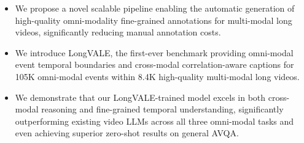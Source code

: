 \begin{itemize}
    \item We propose a novel scalable pipeline enabling the automatic generation of high-quality omni-modality fine-grained annotations for multi-modal long videos, significantly reducing manual annotation costs. 
    \item We introduce LongVALE, the first-ever benchmark providing omni-modal event temporal boundaries and cross-modal correlation-aware captions for 105K omni-modal events within 8.4K high-quality multi-modal long videos.
    \item We demonstrate that our LongVALE-trained model excels in both cross-modal reasoning and fine-grained temporal understanding, significantly outperforming existing video LLMs across all three omni-modal tasks and even achieving superior zero-shot results on general AVQA.
    
\end{itemize}

